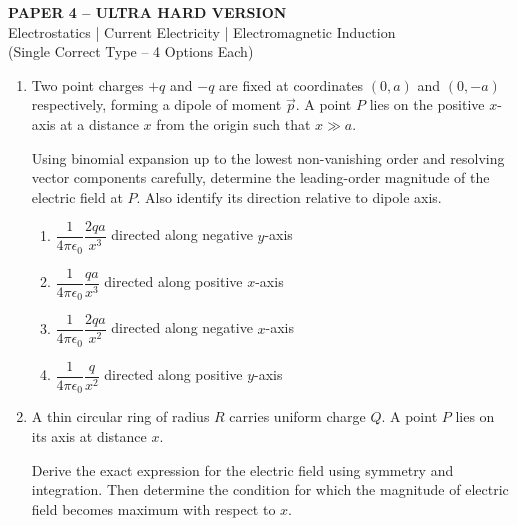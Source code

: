 \documentclass[12pt]{article}
\begin{document}
\begin{center}
\Large \textbf{PAPER 4 – ULTRA HARD VERSION}\\
\large Electrostatics | Current Electricity | Electromagnetic Induction\\
\large (Single Correct Type – 4 Options Each)
\end{center}

\vspace{0.5cm}

\begin{enumerate}


\item Two point charges $+q$ and $-q$ are fixed at coordinates $(0,a)$ and $(0,-a)$ respectively, forming a dipole of moment $\vec p$. A point $P$ lies on the positive $x$-axis at a distance $x$ from the origin such that $x \gg a$.

Using binomial expansion up to the lowest non-vanishing order and resolving vector components carefully, determine the leading-order magnitude of the electric field at $P$. Also identify its direction relative to dipole axis.

\begin{enumerate}[label=\Alph*)]
\item $\dfrac{1}{4\pi\epsilon_0}\dfrac{2qa}{x^3}$ directed along negative $y$-axis
\item $\dfrac{1}{4\pi\epsilon_0}\dfrac{qa}{x^3}$ directed along positive $x$-axis
\item $\dfrac{1}{4\pi\epsilon_0}\dfrac{2qa}{x^2}$ directed along negative $x$-axis
\item $\dfrac{1}{4\pi\epsilon_0}\dfrac{q}{x^2}$ directed along positive $y$-axis
\end{enumerate}

\item A thin circular ring of radius $R$ carries uniform charge $Q$. A point $P$ lies on its axis at distance $x$.

Derive the exact expression for the electric field using symmetry and integration. Then determine the condition for which the magnitude of electric field becomes maximum with respect to $x$.

\begin{center}
\end{center}
\end{enumerate}
\end{document}
